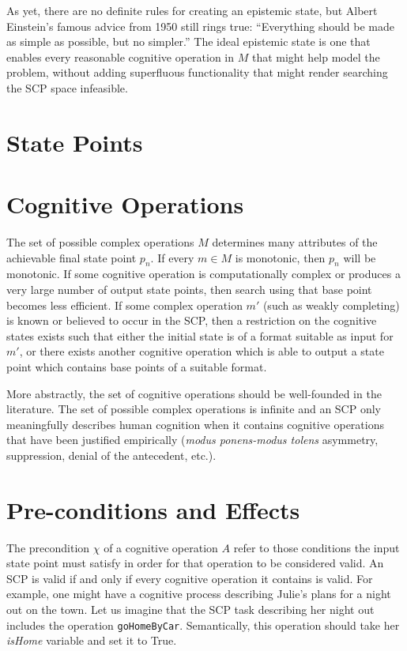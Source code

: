 \documentclass[
11pt, %
english, %
singlespacing, %
headsepline, %
]{MastersDoctoralThesis} %
\begin{document}
As yet, there are no definite rules for creating an epistemic state, but Albert Einstein's famous advice from 1950 still rings true: ``Everything should be made as simple as possible, but no simpler.'' The ideal epistemic state is one that enables every reasonable cognitive operation in $M$ that might help model the problem, without adding superfluous functionality that might render searching the SCP space infeasible.

\section{State Points}
\section{Cognitive Operations}
The set of possible complex operations $M$ determines many attributes of the achievable final state point $p_n$. If every $m \in M$ is monotonic, then $p_n$ will be monotonic. If some cognitive operation is computationally complex or produces a very large number of output state points, then search using that base point becomes less efficient. If some complex operation $m'$ (such as weakly completing) is known or believed to occur in the SCP, then a restriction on the cognitive states exists such that either the initial state is of a format suitable as input for $m'$, or there exists another cognitive operation which is able to output a state point which contains base points of a suitable format.

More abstractly, the set of cognitive operations should be well-founded in the literature. The set of possible complex operations is infinite and an SCP only meaningfully describes human cognition when it contains cognitive operations that have been justified empirically (\textit{modus ponens-modus tolens} asymmetry, suppression, denial of the antecedent, etc.). 

\section{Pre-conditions and Effects} \label{ssec:precond}
The precondition $\chi$ of a cognitive operation $A$ refer to those conditions the input state point must satisfy in order for that operation to be considered valid. An SCP is valid if and only if every cognitive operation it contains is valid. For example, one might have a cognitive process describing Julie's plans for a night out on the town. Let us imagine that the SCP task describing her night out includes the operation \texttt{goHomeByCar}. Semantically, this operation should take her \textit{isHome} variable and set it to True.
\end{document}
